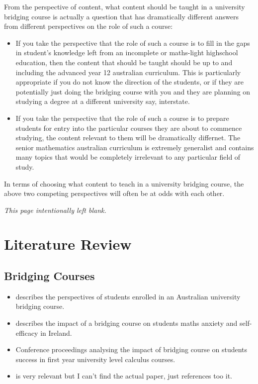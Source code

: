 \documentclass[twoside,12pt,a4paper]{report}
\makeatletter
\newcommand*{\intentionallyblankpage}{
  \vspace*{\fill}
  {\centering \textit{This page intentionally left blank.} \par}
  \vspace{\fill}}
\renewcommand*{\cleardoublepage}{\clearpage\if@twoside \ifodd\c@page\else
  \intentionallyblankpage
  \newpage
  \if@twocolumn\hbox{}\newpage\fi\fi\fi}
\makeatother
\begin{document}
From the perspective of content, what content should be taught in a university bridging course is actually a question that has dramatically different answers from different perspectives on the role of such a course:
\begin{itemize}
	\item If you take the perspective that the role of such a course is to fill in the gaps in student's knowledge left from an incomplete or maths-light highschool education, then the content that should be taught should be up to and including the advanced year 12 australian curriculum. This is particularly appropriate if you do not know the direction of the students, or if they are potentially just doing the bridging course with you and they are planning on studying a degree at a different university say, interstate.
	\item If you take the perspective that the role of such a course is to prepare students for entry into the particular courses they are about to commence studying, the content relevant to them will be dramatically differnet. The senior mathematics australian curriculum is extremely generalist and contains many topics that would be completely irrelevant to any particular field of study. 
\end{itemize}
In terms of choosing what content to teach in a university bridging course, the above two competing perspectives will often be at odds with each other. 


\cleardoublepage
\chapter{Literature Review}
\label{chap:literature}


\section{Bridging Courses}

\begin{itemize}
	\item \cite{Gordon2013} describes the perspectives of students enrolled in an Australian university bridging course.
	\item \cite{Johnson2016} describes the impact of a bridging course on students maths anxiety and self-efficacy in Ireland.
	\item \cite{Poladian2013} Conference proceedings analysing the impact of bridging course on students success in first year university level calculus courses.
	\item \cite{Nicholas2015} is very relevant but I can't find the actual paper, just references too it.
\end{itemize}
\end{document}
